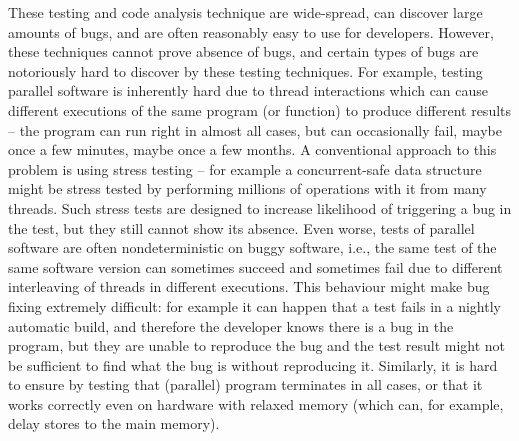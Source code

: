 These testing and code analysis technique are wide-spread, can discover large amounts of bugs, and are often reasonably easy to use for developers.
However, these techniques cannot prove absence of bugs, and certain types of bugs are notoriously hard to discover by these testing techniques.
For example, testing parallel software is inherently hard due to thread interactions which can cause different executions of the same program (or function) to produce different results -- the program can run right in almost all cases, but can occasionally fail, maybe once a few minutes, maybe once a few months.
A conventional approach to this problem is using stress testing -- for example a concurrent-safe data structure might be stress tested by performing millions of operations with it from many threads.
Such stress tests are designed to increase likelihood of triggering a bug in the test, but they still cannot show its absence.
Even worse, tests of parallel software are often nondeterministic on buggy software, i.e., the same test of the same software version can sometimes succeed and sometimes fail due to different interleaving of threads in different executions.
This behaviour might make bug fixing extremely difficult: for example it can happen that a test fails in a nightly automatic build, and therefore the developer knows there is a bug in the program, but they are unable to reproduce the bug and the test result might not be sufficient to find what the bug is without reproducing it.
Similarly, it is hard to ensure by testing that (parallel) program terminates in all cases, or that it works correctly even on hardware with relaxed memory (which can, for example, delay stores to the main memory).

